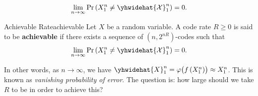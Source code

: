 \documentclass[math]{amznotes}
\theoremstyle{remark}
\begin{document}
\begin{equation*}
    \lim_{n \to \infty}\Pr\left(X_1^n \neq \yhwidehat{\mathcal{X}}_1^n\right) = 0.
\end{equation*} 
\begin{dfnbox}{Achievable Rate}{achievable}
    Let $X$ be a random variable. A code rate $R \geq 0$ is said to be {\color{red} \textbf{achievable}} if there exists a sequence of $\left(n, 2^{nR}\right)$-codes such that 
    \begin{equation*}
        \lim_{n \to \infty}\Pr\left(X_1^n \neq \yhwidehat{\mathcal{X}}_1^n\right) = 0.
    \end{equation*} 
\end{dfnbox}
In other words, as $n \to \infty$, we have $\yhwidehat{X}_1^n = \varphi\bigl(f\left(X_1^n\right)\bigr) \approx X_1^n$. This is known as \textit{vanishing probability of error}. The question is: how large should we take $R$ to be in order to achieve this?
\end{document}
